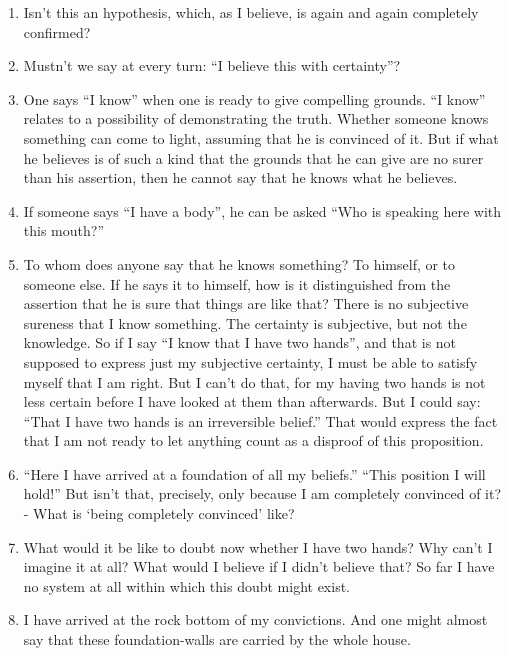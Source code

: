 \documentclass{book}
\begin{document}
\begin{enumerate}
\item
Isn't this an hypothesis, which, as I believe, is again and again completely
confirmed?

\item
Mustn't we say at every turn: ``I believe this with certainty''?

\item
One says ``I know'' when one is ready to give compelling grounds. ``I know''
relates to a possibility of demonstrating the truth. Whether someone knows
something can come to light, assuming that he is convinced of it.  But if what
he believes is of such a kind that the grounds that he can give are no surer
than his assertion, then he cannot say that he knows what he believes.

\item
If someone says ``I have a body'', he can be asked ``Who is speaking here with
this mouth?''

\item
To whom does anyone say that he knows something? To himself, or to someone
else. If he says it to himself, how is it distinguished from the assertion that
he is sure that things are like that? There is no subjective sureness that I
know something. The certainty is subjective, but not the knowledge. So if I say
``I know that I have two hands'', and that is not supposed to express just my
subjective certainty, I must be able to satisfy myself that I am right. But I
can't do that, for my having two hands is not less certain before I have looked
at them than afterwards. But I could say: ``That I have two hands is an
irreversible belief.'' That would express the fact that I am not ready to let
anything count as a disproof of this proposition.

\item
``Here I have arrived at a foundation of all my beliefs.'' ``This position I
will hold!'' But isn't that, precisely, only because I am completely convinced
of it? - What is `being completely convinced' like?

\item
What would it be like to doubt now whether I have two hands? Why can't I
imagine it at all? What would I believe if I didn't believe that? So far I have
no system at all within which this doubt might exist.

\item
I have arrived at the rock bottom of my convictions.  And one might almost say
that these foundation-walls are carried by the whole house.


\end{enumerate}
\end{document}
